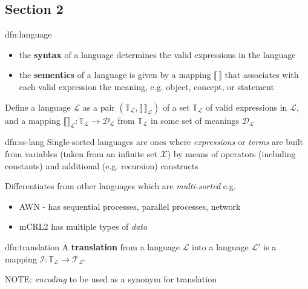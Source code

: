 \documentclass{article}
\begin{document}
\subsection{Section 2}

\begin{dfn}[Language]{dfn:language}{}
    \begin{itemize}
        \item the \textbf{syntax} of a language determines the valid expressions in the language
        \item the \textbf{sementics} of a language is given by a mapping $\llbracket\,\rrbracket$ that associates with each valid expression the meaning, e.g. object, concept, or statement
    \end{itemize}

    Define a language $\mathcal{L}$ as a pair $(\mathbb{T}_{\mathcal{L}}, \llbracket\,\rrbracket_{\mathcal{L}})$ of a set $\mathbb{T}_{\mathcal{L}}$ of valid expressions in $\mathcal{L}$, and a mapping $\llbracket \rrbracket_{\mathcal{L}} : \mathbb{T}_{\mathcal{L}} \to \mathcal{D}_{\mathcal{L}}$ from $\mathbb{T}_{\mathcal{L}}$ in some set of meanings $\mathcal{D}_{\mathcal{L}}$
\end{dfn}

\begin{dfn}{dfn:ss-lang}{}
    Single-sorted languages are ones where \textit{expressions} or \textit{terms} are built from variables (taken from an infinite set $\mathcal{X}$) by means of operators (including constants) and additional (e.g. recursion) constructs

    \longrule{0.08ex}

    Differentiates from other languages which are \textit{multi-sorted} e.g.
    \begin{itemize}
        \item AWN - has sequential processes, parallel processes, network
        \item mCRL2 has multiple types of \textit{data}
    \end{itemize}
\end{dfn}

\begin{dfn}[Translation]{dfn:translation}{}
    A \textbf{translation} from a language $\mathcal{L}$ into a language $\mathcal{L}'$ is a mapping $\mathcal{I} : \mathbb{T}_{\mathcal{L}}\to \mathcal{T}_{\mathcal{L}'}$
\end{dfn}

NOTE: \textit{encoding} to be used as a synonym for translation
\end{document}
